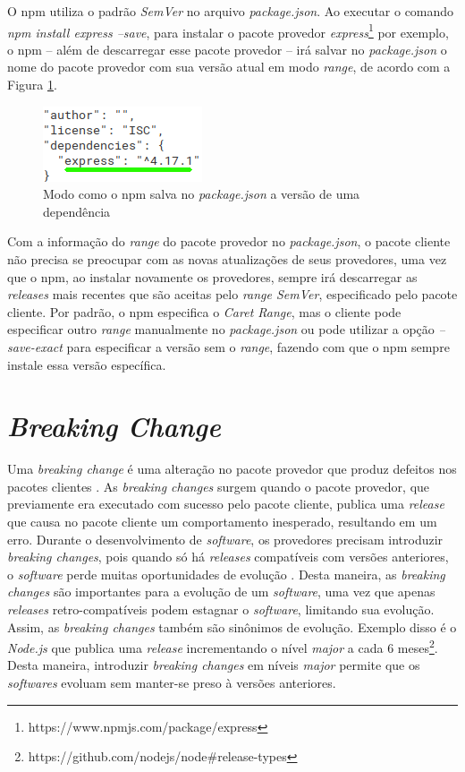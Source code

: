 O \gls{npm} utiliza o padrão \textit{SemVer} no arquivo \textit{package.json}. Ao executar o comando \textit{npm install express --save}, para instalar o pacote provedor \textit{express}\footnote{https://www.npmjs.com/package/express} por exemplo, o \gls{npm} -- além de descarregar esse pacote provedor -- irá salvar no \textit{package.json} o nome do pacote provedor com sua versão atual em modo \textit{range}, de acordo com a Figura \ref{fig:dep_express}.

\begin{figure}
    \centering
    \includegraphics{figuras/dependencies_express.png}
    \caption{Modo como o \gls{npm} salva no \textit{package.json} a versão de uma dependência}
    \label{fig:dep_express}
\end{figure}{}

Com a informação do \textit{range} do pacote provedor no \textit{package.json}, o pacote cliente não precisa se preocupar com as novas atualizações de seus provedores, uma vez que o \gls{npm}, ao instalar novamente os provedores, sempre irá descarregar as \textit{releases} mais recentes que são aceitas pelo \textit{range SemVer}, especificado pelo pacote cliente. Por padrão, o \gls{npm} especifica o \textit{Caret Range}, mas o cliente pode especificar outro \textit{range} manualmente no \textit{package.json} ou pode utilizar a opção \textit{--save-exact} para especificar a versão sem o \textit{range}, fazendo com que o \gls{npm} sempre instale essa versão específica.

\section{\textit{Breaking Change}}
\label{ref-teo:breaking_change}
Uma \textit{breaking change} é uma alteração no pacote provedor que produz defeitos nos pacotes clientes \cite{teorical_reference:semver}. As \textit{breaking changes} surgem quando o pacote provedor, que previamente era executado com sucesso pelo pacote cliente, publica uma \textit{release} que causa no pacote cliente um comportamento inesperado, resultando em um erro. Durante o desenvolvimento de \textit{software}, os provedores precisam introduzir \textit{breaking changes}, pois quando só há \textit{releases} compatíveis com versões anteriores, o \textit{software} perde muitas oportunidades de evolução \cite{teorical_reference:bc_2}. Desta maneira, as \textit{breaking changes} são importantes para a evolução de um \textit{software}, uma vez que apenas \textit{releases} retro-compatíveis podem estagnar o \textit{software}, limitando sua evolução. Assim, as \textit{breaking changes} também são sinônimos de evolução. Exemplo disso é o \textit{Node.js} que publica uma \textit{release} incrementando o nível \textit{major} a cada 6 meses\footnote{https://github.com/nodejs/node\#release-types}. Desta maneira, introduzir \textit{breaking changes} em níveis \textit{major} permite que os \textit{softwares} evoluam sem manter-se preso à versões anteriores.

